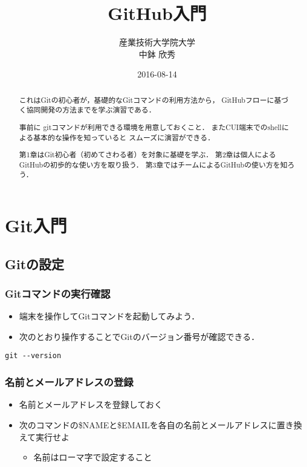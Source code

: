 \documentclass[a4paper,twoside,twocolumn]{bxjsarticle}
\author{産業技術大学院大学\\ 中鉢 欣秀}
\date{2016-08-14}
\title{GitHub入門}
\begin{document}
\maketitle
\begin{abstract}
これはGitの初心者が，基礎的なGitコマンドの利用方法から，
GitHubフローに基づく協同開発の方法までを学ぶ演習である．

事前に gitコマンドが利用できる環境を用意しておくこと．
またCUI端末でのshellによる基本的な操作を知っていると
スムーズに演習ができる．

第1章はGit初心者（初めてさわる者）を対象に基礎を学ぶ．
第2章は個人によるGitHubの初歩的な使い方を取り扱う．
第3章ではチームによるGitHubの使い方を知ろう．
\end{abstract}

\section{Git入門}
\label{sec-1}
\subsection{Gitの設定}
\label{sec-1-1}
\subsubsection{Gitコマンドの実行確認}
\label{sec-1-1-1}
\begin{itemize}
\item 端末を操作してGitコマンドを起動してみよう．
\item 次のとおり操作することでGitのバージョン番号が確認できる．
\end{itemize}

\begin{verbatim}
git --version
\end{verbatim}

\subsubsection{名前とメールアドレスの登録}
\label{sec-1-1-2}
\begin{itemize}
\item 名前とメールアドレスを登録しておく
\item 次のコマンドの\$NAMEと\$EMAILを各自の名前とメールアドレスに置き換えて実行せよ
\begin{itemize}
\item 名前はローマ字で設定すること
\end{itemize}
\end{itemize}
\end{document}
